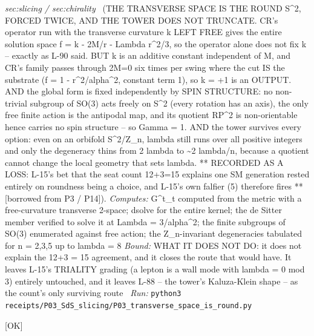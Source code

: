 \begin{description}
\textit{sec:slicing / sec:chirality} \ (THE TRANSVERSE SPACE IS THE ROUND S\textasciicircum{}2, FORCED TWICE, AND THE TOWER DOES NOT TRUNCATE. CR's operator run with the transverse curvature k LEFT FREE gives the entire solution space f = k - 2M/r - Lambda r\textasciicircum{}2/3, so the operator alone does not fix k -- exactly as L-90 said. BUT k is an additive constant independent of M, and CR's family passes through 2M=0 six times per swing where the cut IS the substrate (f = 1 - r\textasciicircum{}2/alpha\textasciicircum{}2, constant term 1), so k = +1 is an OUTPUT. AND the global form is fixed independently by SPIN STRUCTURE: no non-trivial subgroup of SO(3) acts freely on S\textasciicircum{}2 (every rotation has an axis), the only free finite action is the antipodal map, and its quotient RP\textasciicircum{}2 is non-orientable hence carries no spin structure -- so Gamma = 1. AND the tower survives every option: even on an orbifold S\textasciicircum{}2/Z\_n, lambda still runs over all positive integers and only the degeneracy thins from 2 lambda to \textasciitilde{}2 lambda/n, because a quotient cannot change the local geometry that sets lambda. ** RECORDED AS A LOSS: L-15's bet that the seat count 12+3=15 explains one SM generation rested entirely on roundness being a choice, and L-15's own falfier (5) therefore fires ** [borrowed from P3 / P14]). 
\emph{Computes:} G\textasciicircum{}t\_t computed from the metric with a free-curvature transverse 2-space; dsolve for the entire kernel; the de Sitter member verified to solve it at Lambda = 3/alpha\textasciicircum{}2; the finite subgroups of SO(3) enumerated against free action; the Z\_n-invariant degeneracies tabulated for n = 2,3,5 up to lambda = 8
 \emph{Bound:} WHAT IT DOES NOT DO: it does not explain the 12+3 = 15 agreement, and it closes the route that would have. It leaves L-15's TRIALITY grading (a lepton is a wall mode with lambda = 0 mod 3) entirely untouched, and it leaves L-88 -- the tower's Kaluza-Klein shape -- as the count's only surviving route
\ \emph{Run:} \texttt{python3 receipts/P03\_SdS\_slicing/P03\_transverse\_space\_is\_round.py}
\item[\rcptlabel{P03_hexagon_null_triple}{P3R53}\textbf{P3R53}\quad\texttt{P03\_hexagon\_null\_triple}]\hfill\textsf{[OK]}\\

\end{description}
